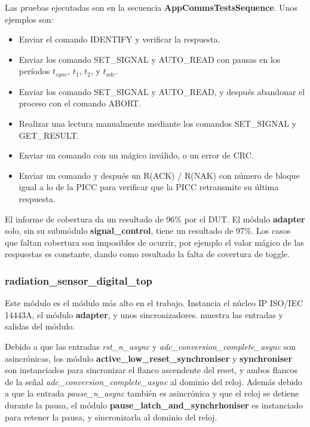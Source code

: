 \documentclass[a4paper, twoside, 11pt]{report}
\begin{document}
Las pruebas ejecutadas son en la secuencia \textbf{AppCommsTestsSequence}. Unos ejemplos son:

\begin{itemize}
  \item Enviar el comando IDENTIFY y verificar la respuesta.
  \item Enviar los comando SET\_SIGNAL y AUTO\_READ con pausas en los períodos $t_{sync}$, $t_1$, $t_2$, y $t_{adc}$.
  \item Enviar los comando SET\_SIGNAL y AUTO\_READ, y después abandonar el proceso con el comando ABORT.
  \item Realizar una lectura manualmente mediante los comandos SET\_SIGNAL y GET\_\-RESULT.
  \item Enviar un comando con un mágico inválido, o un error de CRC.
  \item Enviar un comando y después un R(ACK) / R(NAK) con número de bloque igual a lo de la PICC para verificar que la PICC retransmite su última respuesta.
\end{itemize}

El informe de cobertura da un resultado de 96\% por el DUT. El módulo \textbf{adapter} solo, sin su submódulo \textbf{signal\_control}, tiene un resultado de 97\%. Los casos que faltan cobertura son imposibles de ocurrir, por ejemplo el valor mágico de las respuestas es constante, dando como resultado la falta de covertura de toggle.

\FloatBarrier
\subsubsection{radiation\_sensor\_digital\_top}

Este módulo es el módulo más alto en el trabajo. Instancia el núcleo IP ISO/IEC 14443A, el módulo \textbf{adapter}, y unos sincronizadores.  muestra las entradas y salidas del módulo.

Debido a que las entradas \textit{rst\_n\_async} y \textit{adc\_conversion\_complete\_async} son asincrónicas, los módulo \textbf{active\_low\_reset\_synchroniser} y \textbf{synchroniser} son instanciados para sincronizar el flanco ascendente del reset, y ambos flancos de la señal \textit{adc\_conversion\_\-complete\_async} al dominio del reloj. Además debido a que la entrada \textit{pause\_n\_async} también es asincrónica y que el reloj se detiene durante la pausa, el módulo \textbf{pause\_latch\_and\_synchrhoniser} es instanciado para retener la pausa, y sincronizarla al dominio del reloj.
\end{document}
